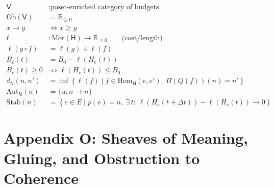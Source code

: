 \documentclass[11pt,oneside]{article}
\begin{document}
\begin{align}
\mathsf{V} &: \text{poset-enriched category of budgets} \\[6pt]
\mathrm{Ob}(\mathsf{V}) &= \mathbb{R}_{\ge 0} \\[4pt]
x \to y &\Longleftrightarrow x \ge y \\[10pt]

\ell &: \mathrm{Mor}(\mathsf{H}) \to \mathbb{R}_{\ge 0} \qquad \text{(cost/length)} \\[10pt]

\ell(g\circ f) &= \ell(g)+\ell(f) \\[10pt]

B_e(t)
&=
B_0 - \ell\!\left(H_e(t)\right)
\\[12pt]

B_e(t) \ge 0
&\Longleftrightarrow
\ell\!\left(H_e(t)\right) \le B_0
\\[14pt]

d_{\mathsf{N}}(n,n')
&=
\inf\left\{
\ell(f) \mid f\in \mathrm{Hom}_{\mathsf{H}}(e,e'),\ \Pi(Q(f))(n)=n'
\right\}
\\[14pt]

\mathrm{Aut}_{\mathsf{N}}(n)
&=
\{u:n\to n\}
\\[12pt]

\mathrm{Stab}(n)
&=
\left\{
e\in E \mid p(e)=n,\ \exists\, t:\ \ell(H_e(t+\Delta t))-\ell(H_e(t))\to 0
\right\}
\end{align}

\section{Appendix O: Sheaves of Meaning, Gluing, and Obstruction to Coherence}
\end{document}
